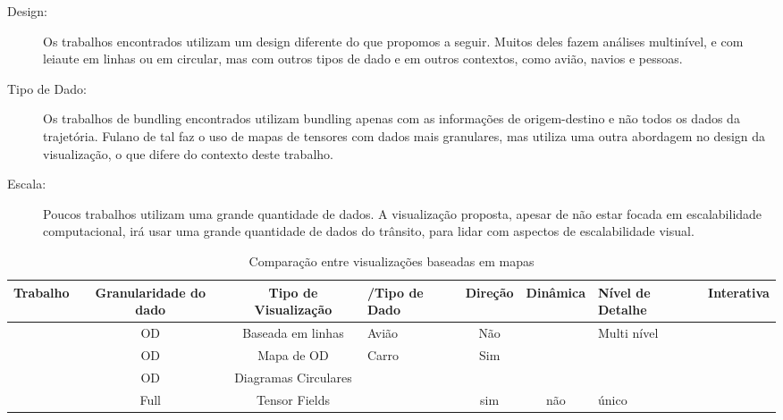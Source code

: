 \begin{description}
  \item[Design:] Os trabalhos encontrados utilizam um design diferente do que propomos a seguir.
  Muitos deles fazem análises multinível, e com leiaute em linhas ou em circular, mas com outros tipos de dado
  e em outros contextos, como avião, navios e pessoas.

  \item[Tipo de Dado:] Os trabalhos de bundling encontrados utilizam bundling
  apenas com as informações de origem-destino e não todos os dados da trajetória.
  Fulano de tal faz o uso de mapas de tensores com dados mais granulares, mas
  utiliza uma outra abordagem no design da visualização, o que difere do contexto
  deste trabalho.

  \item[Escala:] Poucos trabalhos utilizam uma grande quantidade de dados. A visualização
  proposta, apesar de não estar focada em escalabilidade computacional, irá usar
  uma grande quantidade de dados do trânsito, para lidar com aspectos de escalabilidade
  visual.
\end{description}

\begin{table}[]
\caption{Comparação entre visualizações baseadas em mapas}
\begin{tabular}{|c|c|c|l|c|c|l|l|}
\hline
\textbf{Trabalho} & \textbf{Granularidade do dado} & \textbf{Tipo de Visualização} & /Tipo de Dado & \textbf{Direção} & \textbf{Dinâmica} & Nível de Detalhe & Interativa \\ \hline
                  & OD                             & Baseada em linhas             & Avião         & Não              &                   & Multi nível      &            \\ \hline
                  & OD                             & Mapa de OD                    & Carro         & Sim              &                   &                  &            \\ \hline
                  & OD                             & Diagramas Circulares          &               &                  &                   &                  &            \\ \hline
                  & Full                           & Tensor Fields                 &               & sim              & não               & único            &            \\ \hline
\end{tabular}
\end{table}

